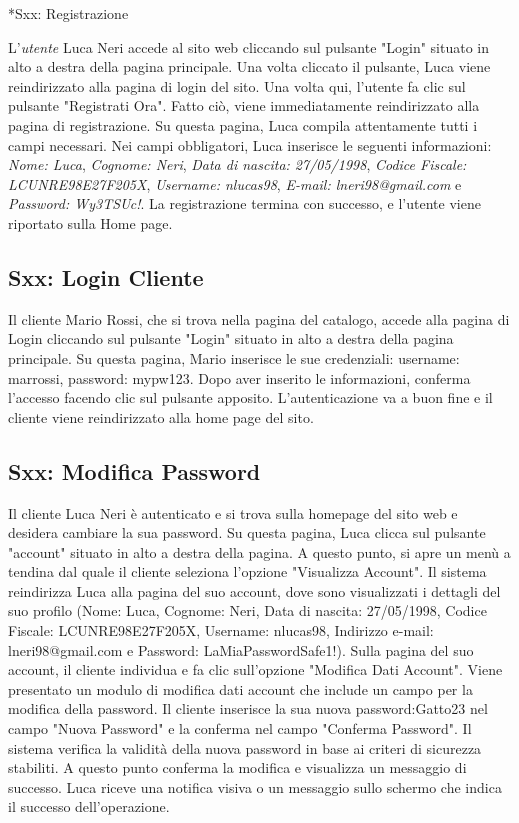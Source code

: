 \documentclass[12pt, a4paper, oneside]{book}
\begin{document}
    *{Sxx: Registrazione}
     L'\textit{utente} Luca Neri accede al sito web cliccando sul pulsante "Login" situato in alto a destra della pagina principale.
     Una volta cliccato il pulsante, Luca viene reindirizzato alla pagina di login del sito.
     Una volta qui, l'utente fa clic sul pulsante "Registrati Ora". Fatto ciò, viene immediatamente reindirizzato alla pagina di registrazione.
     Su questa pagina, Luca compila attentamente tutti i campi necessari. Nei campi obbligatori, Luca inserisce le seguenti informazioni:
     \textit{Nome: Luca}, \textit{Cognome: Neri}, \textit{Data di nascita: 27/05/1998}, \textit{Codice Fiscale: LCUNRE98E27F205X},
      \textit{Username: nlucas98}, \textit{E-mail: lneri98@gmail.com} e \textit{Password: Wy3TSUc!}.
     La registrazione termina con successo, e l’utente viene riportato sulla Home page.

    \subsection*{Sxx: Login Cliente}
    Il cliente Mario Rossi, che si trova nella pagina del catalogo, accede alla pagina di Login cliccando sul pulsante "Login"
    situato in alto a destra della pagina principale.
    Su questa pagina, Mario inserisce le sue credenziali: username: marrossi, password: mypw123.
    Dopo aver inserito le informazioni, conferma l'accesso facendo clic sul pulsante apposito.
    L'autenticazione va a buon fine e il cliente viene reindirizzato alla home page del sito.

    \subsection*{Sxx: Modifica Password}
    Il cliente Luca Neri è autenticato e si trova sulla homepage del sito web e desidera cambiare la sua password.
    Su questa pagina, Luca clicca sul pulsante "account" situato in alto a destra della pagina.
    A questo punto, si apre un menù a tendina dal quale il cliente seleziona l'opzione "Visualizza Account".
    Il sistema reindirizza Luca alla pagina del suo account, dove sono visualizzati i dettagli del suo profilo
    (Nome: Luca, Cognome: Neri, Data di nascita: 27/05/1998, Codice Fiscale: LCUNRE98E27F205X, Username: nlucas98,
     Indirizzo e-mail: lneri98@gmail.com e Password: LaMiaPasswordSafe1!).
    Sulla pagina del suo account, il cliente individua e fa clic sull'opzione "Modifica Dati Account".
    Viene presentato un modulo di modifica dati account che include un campo per la modifica della password.
    Il cliente inserisce la sua nuova password:Gatto23 nel campo "Nuova Password" e la conferma nel campo "Conferma Password".
    Il sistema verifica la validità della nuova password in base ai criteri di sicurezza stabiliti.
    A questo punto conferma la modifica e visualizza un messaggio di successo.
    Luca riceve una notifica visiva o un messaggio sullo schermo che indica il successo dell'operazione.
\end{document}
